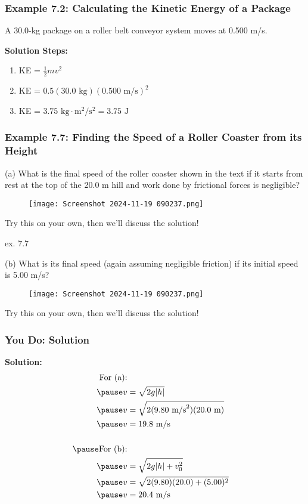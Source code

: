 \documentclass{beamer}
\begin{document}
\begin{frame}
\frametitle{Example 7.2: Calculating the Kinetic Energy of a Package}
A 30.0-kg package on a roller belt conveyor system moves at 0.500 m/s.
\vspace{0.5cm}
\end{frame}

\begin{frame}
\textbf{Solution Steps:}
\begin{enumerate}
    \item KE = $\frac{1}{2}mv^2$ 
    \pause
    \item KE = $0.5(30.0\text{ kg})(0.500\text{ m/s})^2$
    \pause
    \item KE = $3.75\text{ kg}\cdot\text{m}^2/\text{s}^2 = 3.75\text{ J}$
\end{enumerate}
\end{frame}

\begin{frame}
\frametitle{Example 7.7: Finding the Speed of a Roller Coaster from its Height}
(a) What is the final speed of the roller coaster shown in the text if it starts from rest at the top of the 20.0 m hill and work done by frictional forces is negligible?

\begin{figure}[H]
    \centering
    \texttt{[image: Screenshot 2024-11-19 090237.png]}
\end{figure}
Try this on your own, then we'll discuss the solution!
\end{frame}

\begin{frame}{ex. 7.7}
    

(b) What is its final speed (again assuming negligible friction) if its initial speed is 5.00 m/s?

\begin{figure}[H]
    \centering
    \texttt{[image: Screenshot 2024-11-19 090237.png]}
\end{figure}
Try this on your own, then we'll discuss the solution!
\end{frame}

\begin{frame}
\frametitle{You Do: Solution}
\textbf{Solution:}
\begin{align*}
\text{For (a):} \\
\pause
v &= \sqrt{2g|h|} \\
\pause
v &= \sqrt{2(9.80\text{ m/s}^2)(20.0\text{ m})} \\
\pause
v &= 19.8\text{ m/s} \\
\\
\pause
\text{For (b):} \\
\pause
v &= \sqrt{2g|h| + v_0^2} \\
\pause
v &= \sqrt{2(9.80)(20.0) + (5.00)^2} \\
\pause
v &= 20.4\text{ m/s}
\end{align*}
\end{frame}
\end{document}
